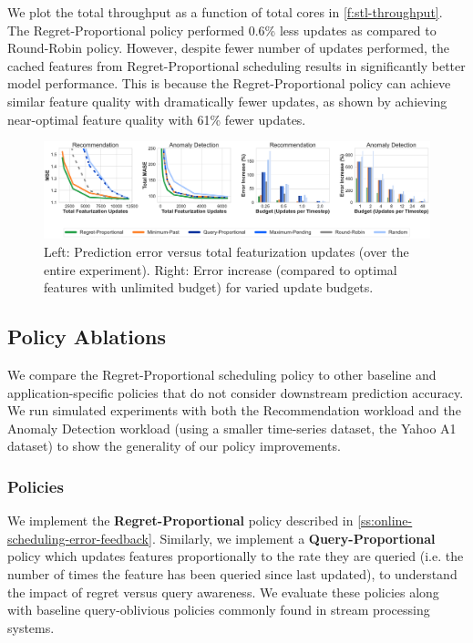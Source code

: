 We plot the total throughput as a function of total cores in \cref{f:stl-throughput}. The Regret-Proportional policy performed 0.6\% less updates as compared to Round-Robin policy. However, despite fewer number of updates performed, the cached features from Regret-Proportional scheduling results in significantly better model performance. This is because the Regret-Proportional policy can achieve similar feature quality with dramatically fewer updates, as shown by achieving near-optimal feature quality with 61\% fewer updates.




\begin{figure}[t]
     \centering
    \includegraphics[width=17cm]{ralf/figures/line_all_no_ir.pdf}
    \caption{Left: Prediction error versus total featurization updates (over the entire experiment). Right: Error increase (compared to optimal features with unlimited budget) for varied update budgets.}
    \label{fig:results-all-line} 
\end{figure}

\subsection{Policy Ablations}
We compare the Regret-Proportional scheduling policy to other baseline and application-specific policies that do not consider downstream prediction accuracy. We run simulated experiments with both the Recommendation workload and the Anomaly Detection workload (using a smaller time-series dataset, the Yahoo A1 dataset) to show the generality of our policy improvements.  
\label{s:policy-evaluation}


\subsubsection{Policies}
We implement the \textbf{Regret-Proportional} policy described in \cref{ss:online-scheduling-error-feedback}. Similarly, we implement a \textbf{Query-Proportional} policy which updates features proportionally to the rate they are queried (i.e. the number of times the feature has been queried since last updated), to understand the impact of regret versus query awareness.  We evaluate these policies along with baseline query-oblivious policies commonly found in stream processing systems. 


